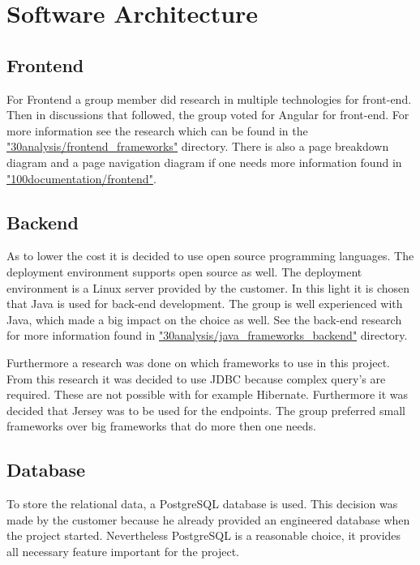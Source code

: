
\chapter{Software Architecture}
\label{ch:architecture}

\section{Frontend}

For Frontend a group member did research in multiple technologies for front-end. Then in discussions that followed, the group voted for Angular for front-end. For more information see the research which can be found in the \href{https://github.com/FSG1/mgmt/tree/master/30analysis/frontend_frameworks}{"30analysis/frontend\_frameworks"} directory. There is also a page breakdown diagram and a page navigation diagram if one needs more information found in \href{https://github.com/FSG1/mgmt/tree/master/100documentation/frontend}{"100documentation/frontend"}.

\section{Backend}

As to lower the cost it is decided to use open source programming languages. The deployment environment supports open source as well. The deployment environment is a Linux server provided by the customer. In this light it is chosen that Java is used for back-end development. The group is well experienced with Java, which made a big impact on the choice as well. See the back-end research for more information found in \href{https://github.com/FSG1/mgmt/tree/master/30analysis/java_frameworks_backend}{"30analysis/java\_frameworks\_backend"} directory.

Furthermore a research was done on which frameworks to use in this project. From this research it was decided to use JDBC because complex query's are required. These are not possible with for example Hibernate. Furthermore it was decided that Jersey was to be used for the endpoints. The group preferred small frameworks over big frameworks that do more then one needs.

\section{Database}

To store the relational data, a PostgreSQL database is used. This decision was made by the customer because he already provided an engineered database when the project started.
Nevertheless PostgreSQL is a reasonable choice, it provides all necessary feature important for the project.

